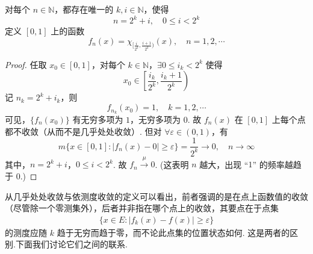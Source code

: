\documentclass[../../main.tex]{subfiles}
\begin{document}
\begin{example}[依测度收敛但不几乎处处收敛的函数]

对每个 $n\in\mathbb{N}$，都存在唯一的 $k,i\in\mathbb{N}$，使得
\[
n = 2^k + i,\quad 0\leqslant i<2^k
\]
定义 $[0,1]$ 上的函数
\[
f_n(x)=\chi_{[\frac{i}{2^k},\frac{i + 1}{2^k})}(x),\quad n = 1,2,\cdots
\]
\end{example}
\begin{proof}
任取 $x_0\in[0,1]$，对每个 $k\in\mathbb{N}$，$\exists 0\leqslant i_k<2^k$ 使得
\[
x_0\in\left[\frac{i_k}{2^k},\frac{i_k + 1}{2^k}\right)
\]
记 $n_k = 2^k + i_k$，则
\[
f_{n_k}(x_0)=1,\quad k = 1,2,\cdots
\]
可见，$\{f_n(x_0)\}$ 有无穷多项为 $1$，无穷多项为 $0$. 故 $f_n(x)$ 在 $[0,1]$ 上每个点都不收敛（从而不是几乎处处收敛）. 但对 $\forall\varepsilon\in(0,1)$，有
\[
m\{x\in[0,1]:\vert f_n(x)-0\vert\geqslant\varepsilon\}=\frac{1}{2^k}\to 0,\quad n\to\infty
\]
其中，$n = 2^k + i$，$0\leqslant i<2^k$. 故 $f_n\stackrel{\mu}{\longrightarrow}0$. (这表明 $n$ 越大，出现 “$1$” 的频率越趋于 $0$.) 

\end{proof}

\vspace{0.4cm}

从几乎处处收敛与依测度收敛的定义可以看出，前者强调的是在点上函数值的收敛（尽管除一个零测集外），后者并非指在哪个点上的收敛，其要点在于点集
\begin{align*}
\{x\in E:\vert f_k(x)-f(x)\vert\geqslant\varepsilon\}
\end{align*}
的测度应随 $k$ 趋于无穷而趋于零，而不论此点集的位置状态如何. 这是两者的区别.下面我们讨论它们之间的联系.
\end{document}
